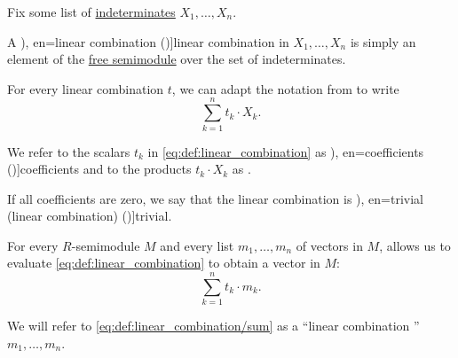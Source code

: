 \begin{definition}\label{def:linear_combination}\mimprovised
  Fix some list of \hyperref[con:indeterminate]{indeterminates} \( X_1, \ldots, X_n \).

  A \term[ru=линейная комбинация (\cite[\S 3.2]{Тыртышников2007ЛинейнаяАлгебра}), en=linear combination (\cite[39]{FriedbergInselSpence2018LinearAlgebra})]{linear combination} in \( X_1, \ldots, X_n \) is simply an element of the \hyperref[def:free_semimodule]{free semimodule} over the set of indeterminates.

  For every linear combination \( t \), we can adapt the notation from  to write
  \begin{equation}\label{eq:def:linear_combination}
    \sum_{k=1}^n t_k \cdot X_k.
  \end{equation}

  We refer to the scalars \( t_k \) in \eqref{eq:def:linear_combination} as \term[ru=коэффициенты (линейной комбинации) (\cite[\S 3.2]{Тыртышников2007ЛинейнаяАлгебра}), en=coefficients (\cite[39]{FriedbergInselSpence2018LinearAlgebra})]{coefficients} and to the products \( t_k \cdot X_k \) as .

  \begin{thmenum}
     If all coefficients are zero, we say that the linear combination is \term[ru=тривиальная (линейная комбинация) (\cite[\S 3.3]{Тыртышников2007ЛинейнаяАлгебра}), en=trivial (linear combination) (\cite[8]{Treil2017LinearAlgebraDoneWrong})]{trivial}.

     For every \( R \)-semimodule \( M \) and every list \( m_1, \ldots, m_n \) of vectors in \( M \),  allows us to evaluate \eqref{eq:def:linear_combination} to obtain a vector in \( M \):
    \begin{equation}\label{eq:def:linear_combination/sum}
      \sum_{k=1}^n t_k \cdot m_k.
    \end{equation}

    We will refer to \eqref{eq:def:linear_combination/sum} as a \enquote{linear combination } \( m_1, \ldots, m_n \).
  \end{thmenum}
\end{definition}

